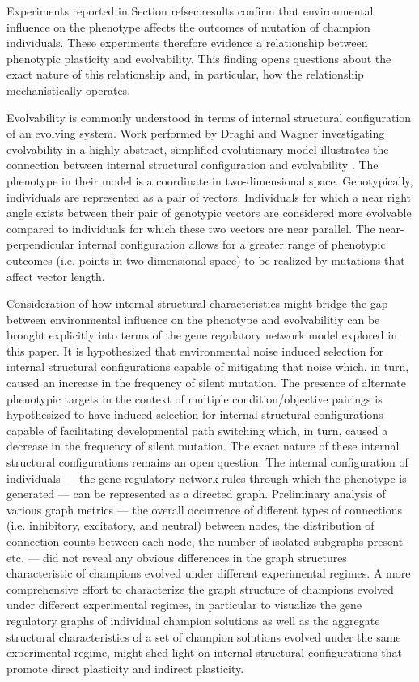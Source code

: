 Experiments reported in Section ref{sec:results} confirm that environmental influence on the phenotype affects the outcomes of mutation of champion individuals.
These experiments therefore evidence a relationship between phenotypic plasticity and evolvability.
This finding opens questions about the exact nature of this relationship and, in particular, how the relationship mechanistically operates.

Evolvability is commonly understood in terms of internal structural configuration of an evolving system.
Work performed by Draghi and Wagner investigating evolvability in a highly abstract, simplified evolutionary model illustrates the connection between internal structural configuration and evolvability \cite{Draghi2008EVOLUTIONMODEL}.
The phenotype in their model is a coordinate in two-dimensional space. 
Genotypically, individuals are represented as a pair of vectors.
Individuals for which a near right angle exists between their pair of genotypic vectors are considered more evolvable compared to individuals for which these two vectors are near parallel.
The near-perpendicular internal configuration allows for a greater range of phenotypic outcomes (i.e. points in two-dimensional space) to be realized by mutations that affect vector length.

Consideration of how internal structural characteristics might bridge the gap between environmental influence on the phenotype and evolvabilitiy can be brought explicitly into terms of the gene regulatory network model explored in this paper.
It is hypothesized that environmental noise induced selection for internal structural configurations capable of mitigating that noise which, in turn, caused an increase in the frequency of silent mutation.
The presence of alternate phenotypic targets in the context of multiple condition/objective pairings is hypothesized to have induced selection for internal structural configurations capable of facilitating developmental path switching which, in turn, caused a decrease in the frequency of silent mutation.
The exact nature of these internal structural configurations remains an open question.
The internal configuration of individuals --- the gene regulatory network rules through which the phenotype is generated --- can be represented as a directed graph.
Preliminary analysis of various graph metrics --- the overall occurrence of different types of connections (i.e. inhibitory, excitatory, and neutral) between nodes, the distribution of connection counts between each node, the number of isolated subgraphs present etc. --- did not reveal any obvious differences in the graph structures characteristic of champions evolved under different experimental regimes.
A more comprehensive effort to characterize the graph structure of champions evolved under different experimental regimes, in particular to visualize the gene regulatory graphs of individual champion solutions as well as the aggregate structural characteristics of a set of champion solutions evolved under the same experimental regime, might shed light on internal structural configurations that promote direct plasticity and indirect plasticity.

